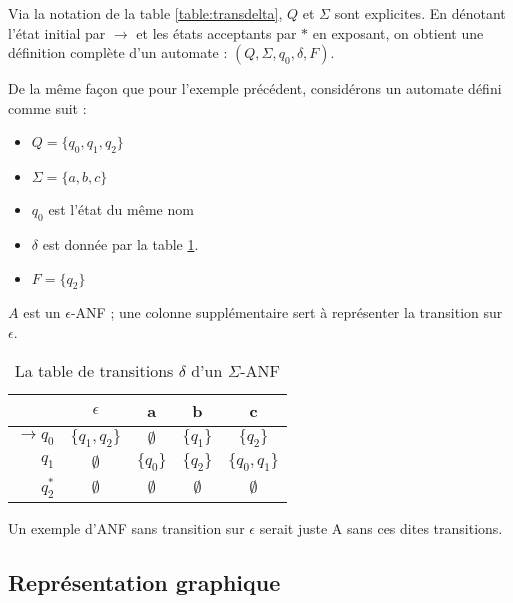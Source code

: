 Via la notation de la table \ref{table:transdelta}, $Q$ et $\Sigma$ sont explicites. En dénotant l'état initial par $\rightarrow$ et les états acceptants par $*$ en exposant, on obtient une définition complète d'un automate : $(Q,\Sigma, q_0, \delta, F)$.

\begin{example}\label{ex:anf}
	 De la même façon que pour l'exemple précédent, considérons un automate \automaton défini comme suit :

\begin{itemize}
	\item $Q=\{q_0,q_1,q_2\}$
	\item $\Sigma=\{a,b,c\}$
	\item $q_0$ est l'état du même nom
	\item $\delta$ est donnée par la table \ref{table:eanfdelta}.
	\item $F=\{q_2\}$
\end{itemize}

$A$ est un $\epsilon$-ANF ; une colonne supplémentaire sert à représenter la transition sur $\epsilon$.

\begin{table}[H]
	\centering
	\begin{tabular}{|r||c|c|c|c|}
		\hline
		&$\epsilon$&a&b&c\\
		\hline\hline
		$\rightarrow q_0$&$\{q_1,q_2\}$&$\emptyset$&$\{q_1\}$&$\{q_2\}$\\\hline
		$q_1$&$\emptyset$&$\{q_0\}$&$\{q_2\}$&$\{q_0,q_1\}$\\\hline
		$q_2^*$&$\emptyset$&$\emptyset$&$\emptyset$&$\emptyset$\\\hline
	\end{tabular}
	\caption{La table de transitions $\delta$ d'un $\Sigma$-ANF}
	\label{table:eanfdelta}
\end{table}

Un exemple d'ANF sans transition sur $\epsilon$ serait juste A sans ces dites transitions.

\end{example}



\subsection{Représentation graphique}

